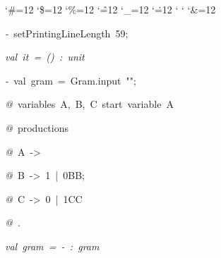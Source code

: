 \begin{list}{}
{\setlength{\leftmargin}{\leftmargini}
\setlength{\rightmargin}{0cm}
\setlength{\itemindent}{0cm}
\setlength{\listparindent}{0cm}
\setlength{\itemsep}{0cm}
\setlength{\parsep}{0cm}
\setlength{\labelsep}{0cm}
\setlength{\labelwidth}{0cm}
\catcode`\#=12
\catcode`\$=12
\catcode`\%=12
\catcode`\^=12
\catcode`\_=12
\catcode`\.=12
\catcode`
\catcode`
\catcode`\&=12
\ttfamily}
\small
\item[]\textsl{-\ }setPrintingLineLength\ 59;
\item[]\textsl{val\ it\ =\ ()\ :\ unit}
\item[]\textsl{-\ }val\ gram\ =\ Gram.input\ "";
\item[]\textsl{@\ }variables\ A,\ B,\ C\ start\ variable\ A
\item[]\textsl{@\ }productions
\item[]\textsl{@\ }A\ ->\ %
\item[]\textsl{@\ }B\ ->\ 1\ |\ 0BB;
\item[]\textsl{@\ }C\ ->\ 0\ |\ 1CC
\item[]\textsl{@\ }.
\item[]\textsl{val\ gram\ =\ -\ :\ gram}
\end{list}

